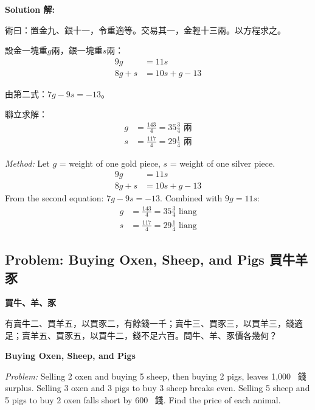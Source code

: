 \documentclass[11pt,a4paper]{article}
\newcommand{\zh}[1]{{\CJKfamily{\CJKrmdefault} #1}}
\newenvironment{chside}{%
  \begin{minipage}[t]{0.48\textwidth}%
  \setlength{\parindent}{1.5em}%
  \linespread{1.25}\selectfont%
  \small%
}{%
  \end{minipage}%
}
\newenvironment{enside}{%
  \hfill\begin{minipage}[t]{0.48\textwidth}%
  \setlength{\parindent}{1em}%
  \linespread{1.15}\selectfont%
  \small%
}{%
  \end{minipage}%
}
\newenvironment{solution}{%
  \par\medskip\noindent\textbf{\textcolor{notecolor}{Solution \zh{解}:}}\par\nopagebreak
  \small\setlength{\parindent}{1em}%
}{%
  \par\medskip%
}
\begin{document}
\begin{solution}
\noindent\begin{chside}
\zh{術曰：置金九、銀十一，令重適等。交易其一，金輕十三兩。以方程求之。}

設金一塊重$g$兩，銀一塊重$s$兩：
\begin{align*}
9g &= 11s \\
8g + s &= 10s + g - 13
\end{align*}

由第二式：$7g - 9s = -13$。

聯立求解：
\begin{align*}
g &= \frac{143}{4} = 35\tfrac{3}{4} \text{ 兩} \\
s &= \frac{117}{4} = 29\tfrac{1}{4} \text{ 兩}
\end{align*}
\end{chside}%
\begin{enside}
\textit{Method:} Let $g$ = weight of one gold piece, $s$ = weight of one
silver piece.
\begin{align*}
9g &= 11s \\
8g + s &= 10s + g - 13
\end{align*}
From the second equation: $7g - 9s = -13$. Combined with $9g = 11s$:
\begin{align*}
g &= \frac{143}{4} = 35\tfrac{3}{4} \text{ liang} \\
s &= \frac{117}{4} = 29\tfrac{1}{4} \text{ liang}
\end{align*}
\end{enside}
\end{solution}

\subsection{Problem: Buying Oxen, Sheep, and Pigs \zh{買牛羊豕}}

\noindent\begin{chside}
\noindent\textbf{買牛、羊、豕}

\zh{有賣牛二、買羊五，以買豕二，有餘錢一千；賣牛三、買豕三，以買羊三，錢適足；賣羊五、買豕五，以買牛二，錢不足六百。問牛、羊、豕價各幾何？}
\end{chside}%
\begin{enside}
\noindent\textbf{Buying Oxen, Sheep, and Pigs}

\textit{Problem:} Selling 2 oxen and buying 5 sheep, then buying 2 pigs,
leaves 1,000~\zh{錢} surplus. Selling 3 oxen and 3 pigs to buy 3 sheep
breaks even. Selling 5 sheep and 5 pigs to buy 2 oxen falls short by 600~\zh{錢}. Find the price of each animal.
\end{enside}
\end{document}
